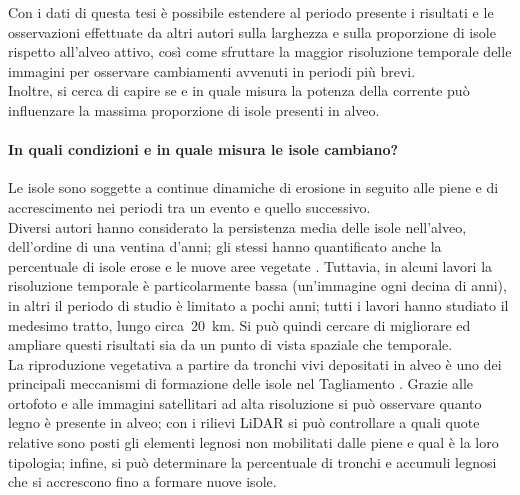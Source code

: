 Con i dati di questa tesi è possibile estendere al periodo presente i risultati e le osservazioni effettuate da altri autori sulla larghezza e sulla proporzione di isole rispetto all'alveo attivo, così come sfruttare la maggior risoluzione temporale delle immagini per osservare cambiamenti avvenuti in periodi più brevi.
\\
Inoltre, si cerca di capire se e in quale misura la potenza della corrente può influenzare la massima proporzione di isole presenti in alveo.%

\paragraph{In quali condizioni e in quale misura le isole cambiano?}
Le isole sono soggette a continue dinamiche di erosione in seguito alle piene e di accrescimento nei periodi tra un evento e quello successivo.
\\
Diversi autori hanno considerato la persistenza media delle isole nell'alveo, dell'ordine di una ventina d'anni; gli stessi hanno quantificato anche la percentuale di isole erose e le nuove aree vegetate .
Tuttavia, in alcuni lavori la risoluzione temporale è particolarmente bassa (un'immagine ogni decina di anni), in altri il periodo di studio è limitato a pochi anni; tutti i lavori hanno studiato il medesimo tratto, lungo circa~\SI{20}{\kilo\m}.
Si può quindi cercare di migliorare ed ampliare questi risultati sia da un punto di vista spaziale che temporale.
\\
La riproduzione vegetativa a partire da tronchi vivi depositati in alveo è uno dei principali meccanismi di formazione delle isole nel Tagliamento . 
Grazie alle ortofoto e alle immagini satellitari ad alta risoluzione si può osservare quanto legno è presente in alveo; con i rilievi LiDAR  si può controllare a quali quote relative sono posti gli elementi legnosi non mobilitati dalle piene e qual è la loro tipologia; infine, si può determinare la percentuale di tronchi e accumuli legnosi che si accrescono fino a formare nuove isole.

